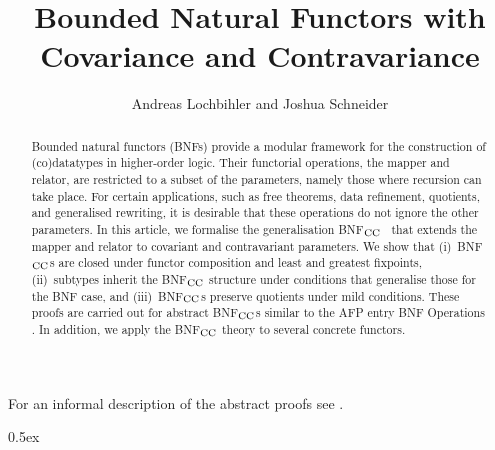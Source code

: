 \documentclass[11pt,a4paper]{article}
\newcommand{\BNFCC}{BNF$\protect\vphantom{F}_{\text{CC}}$}
\begin{document}
\title{Bounded Natural Functors with Covariance and Contravariance}
\author{Andreas Lochbihler and Joshua Schneider}
\maketitle

\begin{abstract}
  Bounded natural functors (BNFs) provide a modular framework for the construction of (co)datatypes in higher-order logic.
  Their functorial operations, the mapper and relator, are restricted to a subset of the parameters, namely those where recursion can take place.
  For certain applications, such as free theorems, data refinement, quotients, and generalised rewriting, it is desirable that these operations do not ignore the other parameters.
  In this article, we formalise the generalisation \BNFCC{}~\cite{LochbihlerSchneider2018ITP} that extends the mapper and relator to covariant and contravariant parameters.
  We show that 
  (i)~\BNFCC{}s are closed under functor composition and least and greatest fixpoints,
  (ii)~subtypes inherit the \BNFCC{} structure under conditions that generalise those for the BNF case, and
  (iii)~\BNFCC{}s preserve quotients under mild conditions.
  These proofs are carried out for abstract \BNFCC{}s similar to the AFP entry BNF Operations \cite{BNF_Operations-AFP}.
  In addition, we apply the \BNFCC{} theory to several concrete functors.
\end{abstract}

For an informal description of the abstract proofs see \cite{LochbihlerSchneider2018ITP}.

\clearpage

\tableofcontents

\clearpage

\parindent 0pt\parskip 0.5ex





\end{document}
